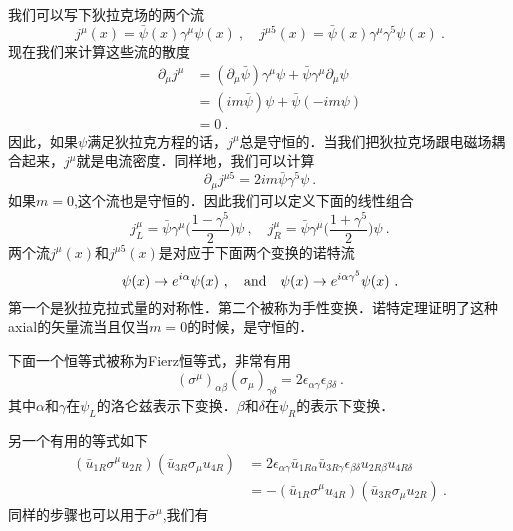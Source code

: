 我们可以写下狄拉克场的两个流
\begin{equation}
j^\mu(x) = \bar\psi(x)\gamma^\mu\psi(x)~, \quad j^{\mu 5}(x) = \bar\psi(x)\gamma^\mu\gamma^5\psi(x)~.
\end{equation}
现在我们来计算这些流的散度
\begin{align}\nonumber
\partial_\mu j^\mu & = (\partial_\mu \bar\psi)\gamma^\mu\psi + \bar\psi\gamma^\mu\partial_\mu\psi \\\nonumber
& = (im \bar\psi) \psi + \bar\psi(-i m \psi)\\
& = 0 ~.
\end{align}
因此，如果$\psi$满足狄拉克方程的话，$j^\mu$总是守恒的．当我们把狄拉克场跟电磁场耦合起来，$j^\mu$就是电流密度．同样地，我们可以计算
\begin{equation}
\partial_\mu j^{\mu 5} = 2 i m \bar\psi \gamma^5 \psi ~.
\end{equation}
如果$m=0$,这个流也是守恒的．因此我们可以定义下面的线性组合
\begin{equation}
j^\mu_L = \bar \psi \gamma^\mu \bigg( \frac{1-\gamma^5}{2} \bigg)\psi ~, \quad j^\mu_R = \bar \psi \gamma^\mu \bigg( \frac{1+\gamma^5}{2} \bigg)\psi ~.
\end{equation}
两个流$j^\mu(x)$和$j^{\mu 5}(x)$是对应于下面两个变换的诺特流
\begin{equation}
\psi(x) \rightarrow e^{i\alpha} \psi(x) ~, \quad {\rm and} \quad \psi(x)\rightarrow e^{i\alpha\gamma^5}\psi(x)~.
\end{equation}
第一个是狄拉克拉式量的对称性．第二个被称为手性变换．诺特定理证明了这种axial的矢量流当且仅当$m=0$的时候，是守恒的．

下面一个恒等式被称为Fierz恒等式，非常有用
\begin{equation}
(\sigma^\mu)_{\alpha\beta}(\sigma_\mu)_{\gamma\delta} = 2 \epsilon_{\alpha\gamma} \epsilon_{\beta\delta}~.
\end{equation}
其中$\alpha$和$\gamma$在$\psi_L$的洛仑兹表示下变换．$\beta$和$\delta$在$\psi_R$的表示下变换．

另一个有用的等式如下
\begin{align}\nonumber
(\bar u_{1R}\sigma^\mu u_{2R})(\bar u_{3R}\sigma_{\mu}u_{4R}) & = 2 \epsilon_{\alpha\gamma} \bar u_{1R\alpha} \bar u_{3R\gamma} \epsilon_{\beta\delta } u_{2 R \beta} u_{4 R \delta }\\
& = - (\bar u_{1R} \sigma^\mu u_{4R})(\bar u_{3R}\sigma_\mu u_{2R})~.
\end{align}
同样的步骤也可以用于$\bar\sigma^\mu$,我们有
\begin{equation}

\end{equation}





